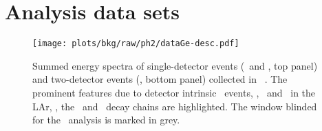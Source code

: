 \section{Analysis data sets}%
\label{sec:bkg:raw:ph2:data}

\begin{figure}
  \centering
  \texttt{[image: plots/bkg/raw/ph2/dataGe-desc.pdf]}
  \caption{%
    Summed energy spectra of single-detector events (\enrBEGeII\ and \enrCoaxII, top
    panel) and two-detector events (\enrGeII, bottom panel) collected in \gerda\
    \phasetwo.  The prominent features due to detector intrinsic \nnbb\ events, \kvz,
    \Arl\ and \Kr\ in the LAr, \kvn, the \Thh\ and \Uh\ decay chains are highlighted. The
    window blinded for the \onbb\ analysis is marked in grey.
  }\label{fig:bkg:raw:ph2:datasets}
\end{figure}

\begin{table}
  \centering
  \caption{%
    Properties of the data sets considered in this analysis. Further details about the
    \gerda\ detectors can be found in past publications~\cite{Agostini2013a,
    Agostini2018a}.  Note that the \bege\ exposure of 31.1~\kgyr\ is higher than the one
    reported in~\cite{Agostini2019a} because additional data for which PSD methods are not
    applicable is here included. \fillme{exposures}
  }\label{tab:bkg:raw:ph2:datasets}
  \small
  
\end{table}%

